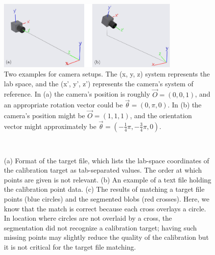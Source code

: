 \documentclass[10pt,a4paper]{article}
\begin{document}
\vspace{.25cm}

\begin{figure}
	\centering
	\includegraphics[width=0.8\textwidth]{Cam_pos_examples.pdf}
	\caption{Two examples for camera setups. The (x, y, z) system represents the lab space, and the (x', y', z') represents the camera's system of reference. In (a) the camera's position is roughly $\vec{O} = (0,0,1)$, and an appropriate rotation vector could be $\vec{\theta} = (0,\pi,0)$. In (b) the camera's position might be $\vec{O} = (1,1,1)$, and the orientation vector might approximately be $\vec{\theta} = (-\frac{1}{4}\pi,-\frac{3}{4}\pi,0)$. \label{fig:cam_pos_example}}
\end{figure}






\begin{figure}[!ht]
	\centering
	\\
	\caption{(a) Format of the target file, which lists the lab-space coordinates of the calibration target as tab-separated values. The order at which points are given is not relevant. (b) An example of a text file holding the calibration point data. (c) The results of matching a target file points (blue circles) and the segmented blobs (red crosses). Here, we know that the match is correct because each cross overlays a circle. In location where circles are not overlaid by a cross, the segmentation did not recognize a calibration target; having such missing points may slightly reduce the quality of the calibration but it is not critical for the target file matching.}
\end{figure}
\end{document}
